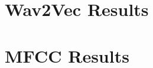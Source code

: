 \documentclass[10pt, reqno]{amsart}
\begin{document}
\setlength{\headheight}{13.0pt}
\setlength{\footskip}{15.0pt}


\bigskip

\section{Wav2Vec Results}



\section{MFCC Results}




\printbibliography
\end{document}
